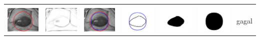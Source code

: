 \begin{table}[H]
\begin{tabular}{|m{0.7in}|m{0.7in}|m{0.7in}|m{0.7in}|m{0.7in}|m{0.7in}|m{0.7in}|}
		&  &  & & & &  \\
		\includegraphics[width=0.7in]{dataset/dataset_3/luka_merah/ready/37_integer_init.jpg}&
		\includegraphics[width=0.7in]{dataset/dataset_3/luka_merah/ready/37_integer_ext.jpg}&
		\includegraphics[width=0.7in]{dataset/dataset_3/luka_merah/ready/37_integer_result.jpg}&
		\includegraphics[width=0.7in]{dataset/dataset_3/luka_merah/ready/37_gt_r_integer.jpg}&
		\includegraphics[width=0.7in]{dataset/dataset_3/luka_merah/ready/37_r.jpg}&
		\includegraphics[width=0.7in]{dataset/dataset_3/luka_merah/ready/37_integer_r.jpg}&
		gagal\\
		\hline
		
	\end{tabular}
\end{table}

